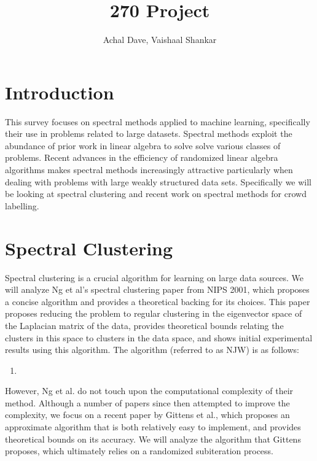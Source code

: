 \documentclass{article}
\title{270 Project}
\author{Achal Dave, Vaishaal Shankar}
\date
\begin{document}
\maketitle
\tableofcontents
\clearpage

\section{Introduction}
This survey focuses on spectral methods applied to machine learning, specifically their use in problems related to large datasets. Spectral methods exploit the abundance of prior work in linear algebra to solve solve various classes of problems. Recent advances in the efficiency of randomized linear algebra algorithms makes spectral methods increasingly attractive particularly when dealing with problems with large weakly structured data sets. Specifically we will be looking at spectral clustering and recent work on spectral methods for crowd labelling.

\section{Spectral Clustering}
    Spectral clustering is a crucial algorithm for learning on large data sources. We will analyze Ng et al's \cite{ng2002spectral} spectral clustering paper from NIPS 2001, which proposes a concise algorithm and provides a theoretical backing for its choices. This paper proposes reducing the problem to regular clustering in the eigenvector space of the Laplacian matrix of the data, provides theoretical bounds relating the clusters in this space to clusters in the data space, and shows initial experimental results using this algorithm.
    The algorithm (referred to as NJW) is as follows:
    \begin{enumerate}
    \item
    \end{enumerate}

    However, Ng et al. do not touch upon the computational complexity of their method. Although a number of papers since then attempted to improve the complexity, we focus on a recent paper by Gittens et al.\cite{gittens2013approximate}, which proposes an approximate algorithm that is both relatively easy to implement, and provides theoretical bounds on its accuracy. We will analyze the algorithm that Gittens proposes, which ultimately relies on a randomized subiteration process.


\newpage
\end{document}
